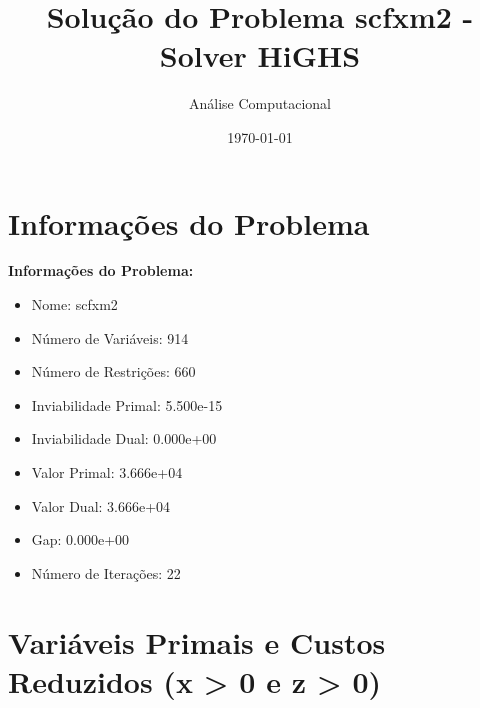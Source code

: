 \documentclass[12pt]{article}
\title{Solução do Problema scfxm2 - Solver HiGHS}
\author{Análise Computacional}
\date{\today}
\begin{document}
\maketitle

\section{Informações do Problema}

\textbf{Informações do Problema:}
\begin{itemize}
\item Nome: scfxm2
\item Número de Variáveis: 914
\item Número de Restrições: 660
\item Inviabilidade Primal: 5.500e-15
\item Inviabilidade Dual: 0.000e+00
\item Valor Primal: 3.666e+04
\item Valor Dual: 3.666e+04
\item Gap: 0.000e+00
\item Número de Iterações: 22
\end{itemize}


\section{Variáveis Primais e Custos Reduzidos (x > 0 e z > 0)}
\end{document}
